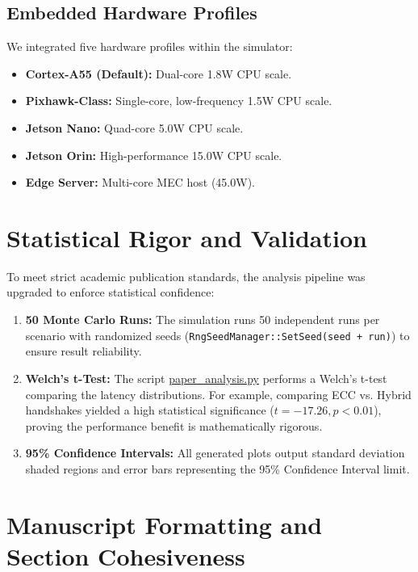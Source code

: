 \documentclass[11pt,a4paper]{article}
\begin{document}
\subsection{Embedded Hardware Profiles}
We integrated five hardware profiles within the simulator:
\begin{itemize}
    \item \textbf{Cortex-A55 (Default):} Dual-core 1.8W CPU scale.
    \item \textbf{Pixhawk-Class:} Single-core, low-frequency 1.5W CPU scale.
    \item \textbf{Jetson Nano:} Quad-core 5.0W CPU scale.
    \item \textbf{Jetson Orin:} High-performance 15.0W CPU scale.
    \item \textbf{Edge Server:} Multi-core MEC host (45.0W).
\end{itemize}

\hrulefill

\section{Statistical Rigor and Validation}

To meet strict academic publication standards, the analysis pipeline was upgraded to enforce statistical confidence:
\begin{enumerate}
    \item \textbf{50 Monte Carlo Runs:} The simulation runs 50 independent runs per scenario with randomized seeds (\texttt{RngSeedManager::SetSeed(seed + run)}) to ensure result reliability.
    \item \textbf{Welch's t-Test:} The script \href{file:///c:/wsl.localhost/Ubuntu-22.04/home/abishek14/Kyber-6G project/scripts/paper_analysis.py}{paper\_analysis.py} performs a Welch's t-test comparing the latency distributions. For example, comparing ECC vs. Hybrid handshakes yielded a high statistical significance ($t = -17.26, p < 0.01$), proving the performance benefit is mathematically rigorous.
    \item \textbf{95\% Confidence Intervals:} All generated plots output standard deviation shaded regions and error bars representing the 95\% Confidence Interval limit.
\end{enumerate}

\hrulefill

\section{Manuscript Formatting and Section Cohesiveness}
\end{document}
